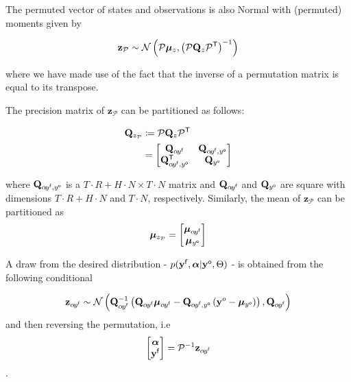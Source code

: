 \documentclass[notitlepage,a4paper,12pt]{article}
\newcommand{\transpose}[1]{{#1}^{\sf{T}}}
\begin{document}
The permuted vector of states and observations is also Normal with (permuted) moments given by 

\begin{equation*}
    \mathbf{z_{\mathcal{P}}} \sim \mathcal{N}\left(\mathcal{P}\boldsymbol{\mu}_z, \left(\mathcal{P} \mathbf{Q}_z \transpose{\mathcal{P}}\right)^{-1}\right)
\end{equation*}

where we have made use of the fact that the inverse of a permutation matrix is equal to its transpose. 

The precision matrix of $\mathbf{z}_{\mathcal{P}}$ can be partitioned as follows: 

\begin{align*}
    \mathbf{Q}_{z_{\mathcal{P}}} &\coloneqq  \mathcal{P} \mathbf{Q}_z \transpose{\mathcal{P}} \\
    &= 
    \begin{bmatrix}
        \mathbf{Q}_{\alpha\! y^{\sf{f}}} & \mathbf{Q}_{\alpha\! y^{\sf{f}}, y^{\sf{o}}} \\ 
        \mathbf{Q}^{\sf{T}}_{\alpha\! y^{\sf{f}}, y^{\sf{o}}} & \mathbf{Q}_{y^{\sf{o}}}
    \end{bmatrix}
\end{align*}

where $\mathbf{Q}_{\alpha\! y^{\sf{f}}, y^{\sf{o}}}$ is a 
$T\!\cdot\!R + H\!\cdot\!N \times T\!\cdot\!N$ matrix and $\mathbf{Q}_{\alpha\! y^{\sf{f}}}$ and $\mathbf{Q}_{y^{\sf{o}}}$ are square with dimensions $T\!\cdot\!R + H\!\cdot\!N$ and $T\!\cdot\!N $, respectively. Similarly, the mean of $\mathbf{z}_{\mathcal{P}}$ can be partitioned as 
$$
\boldsymbol{\mu}_{z_{\mathcal{P}}} = 
\begin{bmatrix}
    \boldsymbol{\mu}_{\alpha\! y^{\sf{f}}} \\
    \boldsymbol{\mu}_{y^{\sf{o}}}
\end{bmatrix}
$$

A draw from the desired distribution - $p(\mathbf{y}^{\sf{f}},\boldsymbol{\alpha} | \mathbf{y}^{\sf{o}},\Theta)$ - is obtained from the following conditional 

\begin{equation*}
    \mathbf{z}_{\alpha\! y^{\sf{f}}} \sim 
    \mathcal{N}\left(
        \mathbf{Q}^{-1}_{\alpha\! y^{\sf{f}}}\left( \mathbf{Q}_{\alpha\! y^{\sf{f}}}\boldsymbol{\mu}_{\alpha\! y^{\sf{f}}} - \mathbf{Q}_{\alpha\! y^{\sf{f}}, y^{\sf{o}}}\left(\mathbf{y}^o-\boldsymbol{\mu}_{y^{\sf{o}}}\right)\right)
    ,
    \mathbf{Q}_{\alpha\! y^{\sf{f}}}
    \right)
\end{equation*}
and then reversing the permutation, i.e 
$$
\begin{bmatrix}
    \boldsymbol{\alpha} \\
    \mathbf{y^{\sf{f}}}
\end{bmatrix}
= 
\mathcal{P}^{-1} \mathbf{z}_{\alpha\! y^{\sf{f}}}
$$.
\end{document}
